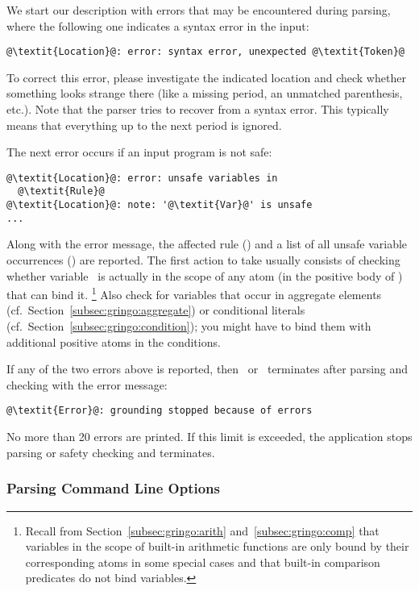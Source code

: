 We start our description with errors that may be encountered during parsing,
where the following one indicates a syntax error in the input:
%
\begin{lstlisting}[numbers=none,escapechar=@]
@\textit{Location}@: error: syntax error, unexpected @\textit{Token}@
\end{lstlisting}
%
To correct this error, please investigate the indicated location
and check whether something looks strange there
(like a missing period, an unmatched parenthesis, etc.).
Note that the parser tries to recover from a syntax error.
This typically means that everything up to the next period is ignored.

The next error occurs if an input program is not safe:
%
\begin{lstlisting}[numbers=none,escapechar=@]
@\textit{Location}@: error: unsafe variables in
  @\textit{Rule}@
@\textit{Location}@: note: '@\textit{Var}@' is unsafe
...
\end{lstlisting}
%
Along with the error message,
the affected rule () and a list of all unsafe variable occurrences () are reported.
The first action to take usually consists of checking whether
variable~ is actually in the scope of any atom
(in the positive body of ) that can bind it.%
\footnote{%
  Recall from Section~\ref{subsec:gringo:arith} and~\ref{subsec:gringo:comp}
  that variables in the scope of built-in arithmetic functions are only bound by their corresponding atoms in some special cases 
  and that built-in comparison predicates do not bind variables.}
Also check for variables that occur in aggregate elements (cf.\ Section~\ref{subsec:gringo:aggregate}) or conditional literals (cf.\ Section~\ref{subsec:gringo:condition});
you might have to bind them with additional positive atoms in the conditions.

If any of the two errors above is reported,
then \gringo\ or \clingo\ terminates after parsing and checking with the error message:
\begin{lstlisting}[numbers=none,escapechar=@]
@\textit{Error}@: grounding stopped because of errors
\end{lstlisting}

\begin{note}
No more than 20 errors are printed.
If this limit is exceeded, the application stops parsing or safety checking and terminates.
\end{note}

\subsubsection{Parsing Command Line Options}\label{subsec:error:options}

